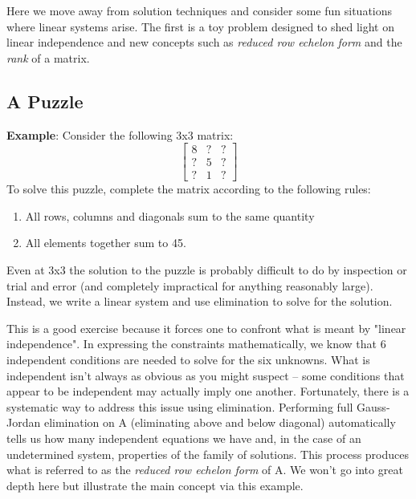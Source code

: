\documentclass[11pt]{article}
\begin{document}
Here we move away from solution techniques and consider some fun
situations where linear systems arise.  The first is a toy problem
designed to shed light on linear independence and new concepts such as
{\em reduced row echelon form} and the {\em rank} of a matrix.
\subsection{A Puzzle}
{\bf Example}: Consider the following 3x3 matrix:
\[
\begin{bmatrix}
8 & ? & ? \\
? & 5 & ? \\
? & 1 & ?
\end{bmatrix}
\]
To solve this puzzle, complete the matrix according to the following rules:
\begin{enumerate}
\item All rows, columns and diagonals sum to the same quantity
\item All elements together sum to 45.
\end{enumerate}

Even at 3x3 the solution to the puzzle is probably difficult to do by
inspection or trial and error (and completely impractical for anything
reasonably large). Instead, we write a linear system and use
elimination to solve for the solution.

This is a good exercise because it forces one to confront what is
meant by "linear independence". In expressing the constraints
mathematically, we know that 6 independent conditions are needed to
solve for the six unknowns. What is independent isn't always as
obvious as you might suspect -- some conditions that appear to be
independent may actually imply one another. Fortunately, there is a
systematic way to address this issue using elimination. Performing
full Gauss-Jordan elimination on A (eliminating above and below
diagonal) automatically tells us how many independent equations we
have and, in the case of an undetermined system, properties of the
family of solutions. This process produces what is referred to as the
{\em reduced row echelon form} of A. We won't go into great depth here
but illustrate the main concept via this example.
\end{document}
